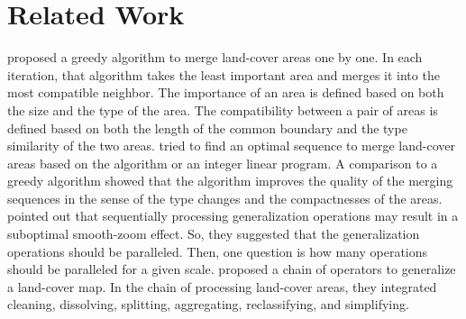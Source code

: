 \documentclass[ijgi,article,submit,moreauthors,pdftex]{Definitions/mdpi}
\begin{document}
 
\section{Related Work}
\label{sec:realted_work}

\citet{vanOosterom2005} proposed a greedy algorithm 
to merge land-cover areas one by one.
In each iteration, that algorithm takes the least important area and 
merges it into the most compatible neighbor.
The importance of an area is defined 
based on both the size and the type of the area.
The compatibility between a pair of areas is defined based on 
both the length of the common boundary and the type similarity
of the two areas. 
\citet[]{Peng2019Thesis} tried to find an optimal sequence 
to merge land-cover areas
based on the \Astar algorithm or an integer linear program.
A comparison to a greedy algorithm showed that 
the \Astar algorithm improves the quality of the merging sequences
in the sense of the type changes and the compactnesses of the areas.
\citet{vanOosterom2014Support} pointed out that 
sequentially processing generalization operations 
may result in a suboptimal smooth-zoom effect.
So, they suggested that
the generalization operations should be paralleled.
Then, one question is how many operations 
should be paralleled for a given scale.
\citet{Thiemann2018LandCover} proposed a chain of operators 
to generalize a land-cover map.
In the chain of processing land-cover areas, 
they integrated cleaning, dissolving, splitting, aggregating, reclassifying, and simplifying. 
\end{document}

